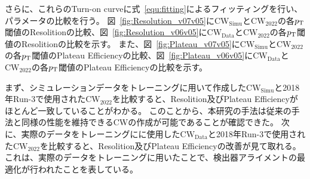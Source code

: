 さらに、これらのTurn-on curveに式~\eqref{equ:fitting}によるフィッティングを行い、パラメータの比較を行う。
図~\ref{fig:Resolution_v07v05}に$\mathrm{CW_{Simu}}$と$\mathrm{CW_{2022}}$の各$p_{\rm{T}}$閾値のResolitionの比較、図~\ref{fig:Resolution_v06v05}に$\mathrm{CW_{Data}}$と$\mathrm{CW_{2022}}$の各$p_{\rm{T}}$閾値のResolitionの比較を示す。
また、図~\ref{fig:Plateau_v07v05}に$\mathrm{CW_{Simu}}$と$\mathrm{CW_{2022}}$の各$p_{\rm{T}}$閾値のPlateau Efficiencyの比較、図~\ref{fig:Plateau_v06v05}に$\mathrm{CW_{Data}}$と$\mathrm{CW_{2022}}$の各$p_{\rm{T}}$閾値のPlateau Efficiencyの比較を示す。

まず、シミュレーションデータをトレーニングに用いて作成した$\mathrm{CW_{Simu}}$と2018年Run-3で使用された$\mathrm{CW_{2022}}$を比較すると、Resolition及びPlateau Efficiencyがほとんど一致していることがわかる。
このことから、本研究の手法は従来の手法と同様の性能を維持できるCWの作成が可能であることが確認できた。
次に、実際のデータをトレーニングにに使用した$\mathrm{CW_{Data}}$と2018年Run-3で使用された$\mathrm{CW_{2022}}$を比較すると、Resolition及びPlateau Efficiencyの改善が見て取れる。これは、実際のデータをトレーニングに用いたことで、検出器アライメントの最適化が行われたことを表している。

